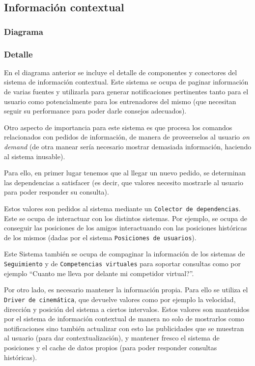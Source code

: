\subsection{Información contextual}
\subsubsection{Diagrama}


\subsubsection{Detalle}

En el diagrama anterior se incluye el detalle de componentes y
conectores del sistema de información contextual. Este sistema
se ocupa de paginar información de varias fuentes y utilizarla para
generar notificaciones pertinentes tanto para el usuario como 
potencialmente para los entrenadores del mismo (que necesitan seguir
su performance para poder darle consejos adecuados).

Otro aspecto de importancia para este sistema es que procesa los 
comandos relacionados con pedidos de información, de manera de 
proveerselos al usuario \textit{on demand} (de otra manear sería
necesario mostrar demasiada información, haciendo al sistema inusable).

Para ello, en primer lugar tenemos que al llegar un nuevo pedido, se
determinan las dependencias a satisfacer (es decir, que valores 
necesito mostrarle al usuario para poder responder su consulta).

Estos valores son pedidos al sistema mediante un 
\texttt{Colector de dependencias}. Este se ocupa de interactuar con
los distintos sistemas. Por ejemplo, se ocupa de conseguir las 
posiciones de los amigos interactuando con las posiciones históricas
de los mismos (dadas por el sistema \texttt{Posiciones de usuarios}).

Este Sistema también se ocupa de compaginar la información de los
sistemas de \texttt{Seguimiento} y de \texttt{Competencias virtuales}
para soportar consultas como por ejemplo ``Cuanto me lleva por delante
mi competidor virtual?''. 

Por otro lado, es necesario mantener la información propia. Para ello
se utiliza el \texttt{Driver de cinemática}, que devuelve valores como
por ejemplo la velocidad, dirección y posición del sistema a 
ciertos intervalos. Estos valores son mantenidos por el sistema de
información contextual de manera no solo de mostrarlos como 
notificaciones sino también actualizar con esto las publicidades que
se muestran al usuario (para dar contextualización), y mantener fresco
el sistema de posiciones y el cache de datos propios (para poder
responder consultas históricas). 

